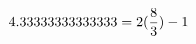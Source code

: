 \documentclass[preview]{standalone}
\begin{document}
\begin{align*}
\special{dvisvgm:raw <g id='unique000'>}4.33333333333333 = 2(\frac{8}{3})-1\special{dvisvgm:raw </g>}
\end{align*}
\end{document}
